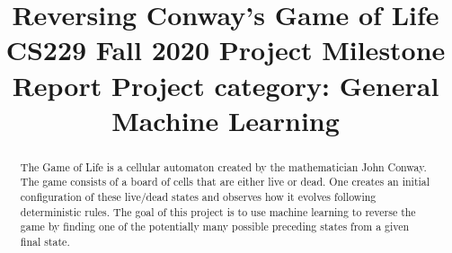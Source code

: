 \documentclass[conference]{IEEEtran}
\begin{document}
\title{Reversing Conway's Game of Life\\
{\footnotesize CS229 Fall 2020 Project Milestone Report \hspace{2cm}
Project category: General Machine Learning}
}



\author{
\and
{}
\and
{}
}

\maketitle

\begin{abstract}
The Game of Life is a cellular automaton created by the mathematician John Conway. The game consists of a board of cells that are either live or dead. One creates an initial configuration of these live/dead states and observes how it evolves \cite{b1} \cite{b2} following deterministic rules. The goal of this project is to use machine learning to reverse the game by finding one of the potentially many possible preceding states from a given final state.
\end{abstract}

\begin{comment}
\begin{IEEEkeywords}
convolutional neural networks, Kaggle competition, game, simulators
\end{IEEEkeywords}
\end{comment}
\end{document}
